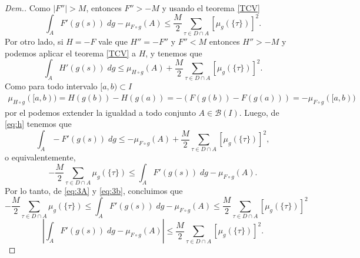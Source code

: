 \begin{proof}[Dem.]
    Como $|F''|>M$,  entonces $F''>-M$ y usando el teorema \ref{TCV}
    \begin{equation}
    \int_AF'(g(s)) \; dg  -\mu_{F\circ g}(A)\leq \dfrac{M}{2}\sum_{\tau\in D\cap A}\left[\mu_g(\{\tau \})\right]^2.\label{eq:3A}
    \end{equation}
    Por otro lado, si $H=-F$ vale que $H''=-F''$ y $F''<M$ entonces
    $H''>-M$ y podemos aplicar el teorema \ref{TCV} a $H$, y tenemos que
    \begin{equation}
        \int_A H'(g(s)) \; dg  \leq\mu_{H\circ g}(A)+ \dfrac{M}{2}\sum_{\tau\in D\cap A}\left[\mu_g(\{\tau \})\right]^2.\label{eq:h}
    \end{equation}
    Como para todo intervalo $[a,b)\subset I$
    \begin{multline*}
        \mu_{H\circ g}([a,b))=H(g(b))-H(g(a))=-\left( F(g(b))-F(g(a))\right)=-\mu_{F\circ g}([a,b))
    \end{multline*}
    por el  \cite[Lema 1.17]{folland} podemos extender la igualdad a todo conjunto $A\in\mathcal{B}(I)$. Luego, de \eqref{eq:h} tenemos que
    \begin{equation*}
        \int_A -F'(g(s)) \; dg  \leq-\mu_{F\circ g}(A)+ \dfrac{M}{2}\sum_{\tau\in D\cap A}\left[\mu_g(\{\tau \})\right]^2,
    \end{equation*}
    o equivalentemente,
    \begin{equation}
        - \dfrac{M}{2}\sum_{\tau\in D\cap A}\mu_g(\{\tau \})\leq \int_A F'(g(s)) \; dg  -\mu_{F\circ g}(A).\label{eq:3b}
    \end{equation}
Por lo tanto, de \eqref{eq:3A} y \eqref{eq:3b}, concluimos que
\begin{equation*}
        - \dfrac{M}{2}\sum_{\tau\in D\cap A}\mu_g(\{\tau \})\leq \int_A F'(g(s)) \; dg  -\mu_{F\circ g}(A)\leq \dfrac{M}{2}\sum_{\tau\in D\cap A}\left[\mu_g(\{\tau \})\right]^2
    \end{equation*}
    $$\left| \int_A F'(g(s)) \; dg  -\mu_{F\circ g}(A)\right| \leq \dfrac{M}{2}\sum_{\tau\in D\cap A}\left[\mu_g(\{\tau \})\right]^2.$$
\end{proof}



